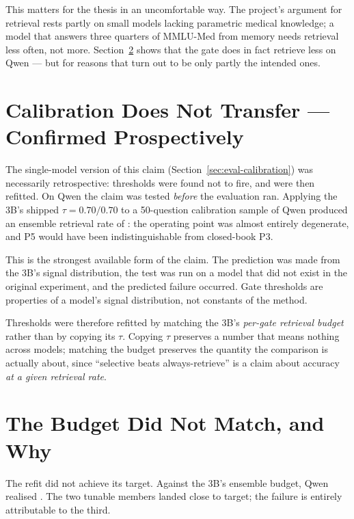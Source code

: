 This matters for the thesis in an uncomfortable way. The project's argument
for retrieval rests partly on small models lacking parametric medical
knowledge; a model that answers three quarters of MMLU-Med from memory needs
retrieval less often, not more. Section~\ref{sec:qwen-budget} shows that the
gate does in fact retrieve less on Qwen --- but for reasons that turn out to
be only partly the intended ones.

\section{Calibration Does Not Transfer --- Confirmed Prospectively}
\label{sec:qwen-nontransfer}

The single-model version of this claim (Section~\ref{sec:eval-calibration})
was necessarily retrospective: thresholds were found not to fire, and were
then refitted. On Qwen the claim was tested \emph{before} the evaluation ran.
Applying the 3B's shipped $\tau = 0.70/0.70$ to a 50-question calibration
sample of Qwen produced an ensemble retrieval rate of
\retQwenCalibAtLlamaTau{}: the operating point was almost entirely
degenerate, and P5 would have been indistinguishable from closed-book P3.

This is the strongest available form of the claim. The prediction was made
from the 3B's signal distribution, the test was run on a model that did not
exist in the original experiment, and the predicted failure occurred. Gate
thresholds are properties of a model's signal distribution, not constants of
the method.

Thresholds were therefore refitted by matching the 3B's \emph{per-gate
retrieval budget} rather than by copying its $\tau$. Copying $\tau$ preserves
a number that means nothing across models; matching the budget preserves the
quantity the comparison is actually about, since ``selective beats
always-retrieve'' is a claim about accuracy \emph{at a given retrieval rate}.

\section{The Budget Did Not Match, and Why}
\label{sec:qwen-budget}



The refit did not achieve its target. Against the 3B's \retPfiveMcq{}
ensemble budget, Qwen realised \retQwenPfiveMcq{}. The two tunable members
landed close to target; the failure is entirely attributable to the third.

